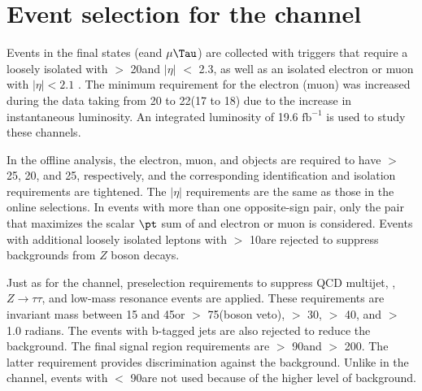 \section{\texorpdfstring{Event selection for the \leptonTau channel}{Event selection for the lepton-tau channel}}
\label{sect:eleTauCuts}
Events in the \leptonTau final states (e\Tau and $\mu\Tau$)
are collected with triggers that require 
a loosely isolated \Tau with \PT $>$ 20\GeV and $|\eta|$ $<$ 2.3, as well as
an isolated electron or muon with $|\eta| < 2.1$ \cite{Chatrchyan:2011nv,Khachatryan:2015hwa,Chatrchyan:2012xi}.  The minimum
\PT requirement for the electron (muon) was increased during the data taking from 20 to 22\GeV (17 to 18\GeV)
due to the increase in instantaneous luminosity. An integrated luminosity of 19.6 $\mathrm{fb}^{-1}$ is used to study these channels.

In the offline analysis, the electron, muon, and \Tau objects are required to have \PT $>$ 25, 20, and 25\GeV, respectively, 
and the corresponding identification and isolation requirements are tightened. The $|\eta|$ requirements are the same as those in the online selections.
In events with more than one opposite-sign \leptonTau pair, only 
 the pair that maximizes the scalar $\pt$ sum of \Tau and electron or muon is considered.  Events with additional loosely isolated leptons
with \PT $>$ 10\GeV are rejected to suppress backgrounds from $Z$ boson
decays.  

Just as for the \tauTau channel, preselection requirements to suppress
QCD multijet, \ttbar, $Z \to \tau \tau$, and low-mass resonance events are applied.
These requirements are \leptonTau 
invariant mass between 15 and 45\GeV or $>$ 75\GeV (\Z boson veto), \MPT $>$ 30\GeV, \mttwo $>$ 40\GeV, 
and \deltaphi $>$ 1.0 radians. 
The events with b-tagged jets are also rejected to reduce the \ttbar background.
 The final signal region requirements are \mttwo $>$ 90\GeV and \tauMT $>$ 200\GeV. %
The latter requirement provides discrimination against the \wjets background.  Unlike in the \tauTau channel,
events with \mttwo $<$ 90\GeV are not used because of the higher 
level of background. 

